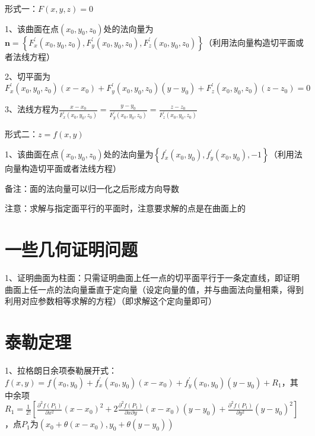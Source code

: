 形式一：$F(x, y, z)=0$

1、该曲面在点$\left(x_{0}, y_{0}, z_{0}\right)$处的法向量为$\boldsymbol{n}=\left\{F_{x}^{\prime}\left(x_{0}, y_{0}, z_{0}\right), F_{y}^{\prime}\left(x_{0}, y_{0}, z_{0}\right), F_{z}^{\prime}\left(x_{0}, y_{0}, z_{0}\right)\right\}$（利用法向量构造切平面或者法线方程）

2、切平面为$F_{x}^{\prime}\left(x_{0}, y_{0}, z_{0}\right)\left(x-x_{0}\right)+F_{y}^{\prime}\left(x_{0}, y_{0}, z_{0}\right)\left(y-y_{0}\right)+F_{z}^{\prime}\left(x_{0}, y_{0}, z_{0}\right)\left(z-z_{0}\right)=0 $

3、法线方程为$\frac{x-x_{0}}{F_{x}^{\prime}\left(x_{0}, y_{0}, z_{0}\right)}=\frac{y-y_{0}}{F_{y}^{\prime}\left(x_{0}, y_{0}, z_{0}\right)}=\frac{z-z_{0}}{F_{z}^{\prime}\left(x_{0}, y_{0}, z_{0}\right)}$

形式二：$z=f(x, y)$

1、该曲面在点$\left(x_{0}, y_{0}, z_{0}\right)$处的法向量为$\left\{f_{x}^{\prime}\left(x_{0}, y_{0}\right),f_{y}^{\prime}\left(x_{0}, y_{0}\right),-1\right\}$（利用法向量构造切平面或者法线方程）

备注：面的法向量可以归一化之后形成方向导数

注意：求解与指定面平行的平面时，注意要求解的点是在曲面上的



\section{一些几何证明问题}

1、证明曲面为柱面：只需证明曲面上任一点的切平面平行于一条定直线，即证明曲面上任一点的法向量垂直于定向量（设定向量的值，并与曲面法向量相乘，得到利用对应参数相等求解的方程）（即求解这个定向量即可）

\section{泰勒定理}

1、拉格朗日余项泰勒展开式：$f(x, y)=f\left(x_{0}, y_{0}\right)+f_{x}^{\prime}\left(x_{0}, y_{0}\right)\left(x-x_{0}\right)+f_{y}^{\prime}\left(x_{0}, y_{0}\right)\left(y-y_{0}\right)+R_{1}$，其中余项$R_{1}=\frac{1}{2 !}[\frac{\partial^{2} f\left(P_{1}\right)}{\partial x^{2}}\left(x-x_{0}\right)^{2}+2 \frac{\partial^{2} f\left(P_{1}\right)}{\partial x \partial y}\left(x-x_{0}\right)\left(y-y_{0}\right)+\frac{\partial^{2} f\left(P_{1}\right)}{\partial y^{2}}\left(y-y_{0}\right)^{2}]$，点$P_{1}$为$\left(x_{0}+\theta\left(x-x_{0}\right), y_{0}+\theta\left(y-y_{0}\right)\right)$

